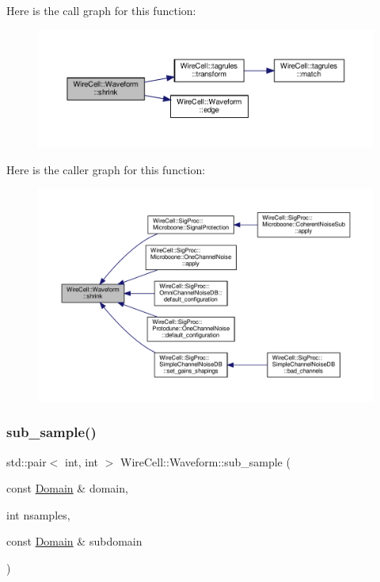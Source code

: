Here is the call graph for this function\+:
\nopagebreak
\begin{figure}[H]
\begin{center}
\leavevmode
\includegraphics[width=350pt]{namespace_wire_cell_1_1_waveform_adad443bd3c3ee1a0c2e65c9a39282a53_cgraph}
\end{center}
\end{figure}
Here is the caller graph for this function\+:
\nopagebreak
\begin{figure}[H]
\begin{center}
\leavevmode
\includegraphics[width=350pt]{namespace_wire_cell_1_1_waveform_adad443bd3c3ee1a0c2e65c9a39282a53_icgraph}
\end{center}
\end{figure}
\mbox{\label{namespace_wire_cell_1_1_waveform_a841c4668962007ef512b7a7df6ecfece}} 
\subsubsection{\texorpdfstring{sub\+\_\+sample()}{sub\_sample()}}
{\footnotesize\ttfamily std\+::pair$<$ int, int $>$ Wire\+Cell\+::\+Waveform\+::sub\+\_\+sample (\begin{DoxyParamCaption}\item[{const \hyperlink{namespace_wire_cell_1_1_waveform_aa783b1c2a84242349d5c798b7483727b}{Domain} \&}]{domain,  }\item[{int}]{nsamples,  }\item[{const \hyperlink{namespace_wire_cell_1_1_waveform_aa783b1c2a84242349d5c798b7483727b}{Domain} \&}]{subdomain }\end{DoxyParamCaption})}



